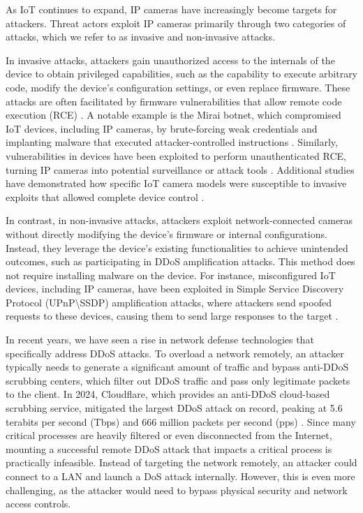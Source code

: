 As IoT continues to expand, IP cameras have increasingly become targets for attackers. Threat actors exploit IP cameras primarily through two categories of attacks, which we refer to as invasive and non-invasive attacks.

In invasive attacks, attackers gain unauthorized access to the internals of the device to obtain privileged capabilities, such as the capability to execute arbitrary code, modify the device’s configuration settings, or even replace firmware. These attacks are often facilitated by firmware vulnerabilities that allow remote code execution (RCE) \cite{alrawi2019ip}. A notable example is the Mirai botnet, which compromised IoT devices, including IP cameras, by brute-forcing weak credentials and implanting malware that executed attacker-controlled instructions \cite{antonakakis2017mirai}. 
Similarly, vulnerabilities in devices have been exploited to perform unauthenticated RCE, turning IP cameras into potential surveillance or attack tools \cite{watchfulip2021hikvision}. Additional studies have demonstrated how specific IoT camera models were susceptible to invasive exploits that allowed complete device control \cite{stabili2024tenda}.

In contrast, in non-invasive attacks, attackers exploit network-connected cameras without directly modifying the device's firmware or internal configurations. Instead, they leverage the device's existing functionalities to achieve unintended outcomes, such as participating in DDoS amplification attacks. This method does not require installing malware on the device. For instance, misconfigured IoT devices, including IP cameras, have been exploited in Simple Service Discovery Protocol (UPnP\textbackslash SSDP) amplification attacks, where attackers send spoofed requests to these devices, causing them to send large responses to the target \cite{kolias2017mirai, helpnetsecurity2019ssdp}.


In recent years, we have seen a rise in network defense technologies that specifically address DDoS attacks. 
To overload a network remotely, an attacker typically needs to generate a significant amount of traffic and bypass anti-DDoS scrubbing centers, which filter out DDoS traffic and pass only legitimate packets to the client. In 2024, Cloudflare, which provides an anti-DDoS cloud-based scrubbing service, mitigated the largest DDoS attack on record, peaking at 5.6 terabits per second (Tbps) and 666 million packets per second (pps) \cite{cloudflare_famous_ddos}. Since many critical processes are heavily filtered or even disconnected from the Internet, mounting a successful remote DDoS attack that impacts a critical process is practically infeasible.
Instead of targeting the network remotely, an attacker could connect to a LAN and launch a DoS attack internally. 
However, this is even more challenging, as the attacker would need to bypass physical security and network access controls.

